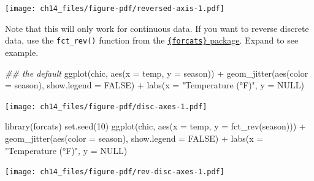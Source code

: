 \documentclass[
  letterpaper,
]{scrbook}
\newenvironment{Shaded}{\begin{snugshade}}{\end{snugshade}}
\newcommand{\AttributeTok}[1]{\textcolor[rgb]{0.40,0.45,0.13}{#1}}
\newcommand{\ConstantTok}[1]{\textcolor[rgb]{0.56,0.35,0.01}{#1}}
\newcommand{\DecValTok}[1]{\textcolor[rgb]{0.68,0.00,0.00}{#1}}
\newcommand{\DocumentationTok}[1]{\textcolor[rgb]{0.37,0.37,0.37}{\textit{#1}}}
\newcommand{\FunctionTok}[1]{\textcolor[rgb]{0.28,0.35,0.67}{#1}}
\newcommand{\NormalTok}[1]{\textcolor[rgb]{0.00,0.23,0.31}{#1}}
\newcommand{\SpecialCharTok}[1]{\textcolor[rgb]{0.37,0.37,0.37}{#1}}
\newcommand{\StringTok}[1]{\textcolor[rgb]{0.13,0.47,0.30}{#1}}
\begin{document}
\texttt{[image: ch14\_files/figure-pdf/reversed-axis-1.pdf]}

\begin{tcolorbox}[enhanced jigsaw, toprule=.15mm, bottomtitle=1mm, coltitle=black, breakable, colbacktitle=quarto-callout-note-color!10!white, opacityback=0, toptitle=1mm, colframe=quarto-callout-note-color-frame, titlerule=0mm, title=\textcolor{quarto-callout-note-color}{\faInfo}\hspace{0.5em}{Note}, bottomrule=.15mm, arc=.35mm, opacitybacktitle=0.6, leftrule=.75mm, left=2mm, rightrule=.15mm, colback=white]

Note that this will only work for continuous data. If you want to
reverse discrete data, use the \texttt{fct\_rev()} function from the
\href{https://forcats.tidyverse.org/}{\texttt{\{forcats\}} package}.
Expand to see example.

\begin{Shaded}
\begin{Highlighting}[]
\DocumentationTok{\#\# the default}
\FunctionTok{ggplot}\NormalTok{(chic, }\FunctionTok{aes}\NormalTok{(}\AttributeTok{x =}\NormalTok{ temp, }\AttributeTok{y =}\NormalTok{ season)) }\SpecialCharTok{+}
  \FunctionTok{geom\_jitter}\NormalTok{(}\FunctionTok{aes}\NormalTok{(}\AttributeTok{color =}\NormalTok{ season), }\AttributeTok{show.legend =} \ConstantTok{FALSE}\NormalTok{) }\SpecialCharTok{+}
  \FunctionTok{labs}\NormalTok{(}\AttributeTok{x =} \StringTok{"Temperature (°F)"}\NormalTok{, }\AttributeTok{y =} \ConstantTok{NULL}\NormalTok{)}
\end{Highlighting}
\end{Shaded}

\texttt{[image: ch14\_files/figure-pdf/disc-axes-1.pdf]}

\begin{Shaded}
\begin{Highlighting}[]
\FunctionTok{library}\NormalTok{(forcats)}
\FunctionTok{set.seed}\NormalTok{(}\DecValTok{10}\NormalTok{)}
\FunctionTok{ggplot}\NormalTok{(chic, }\FunctionTok{aes}\NormalTok{(}\AttributeTok{x =}\NormalTok{ temp, }\AttributeTok{y =} \FunctionTok{fct\_rev}\NormalTok{(season))) }\SpecialCharTok{+}
  \FunctionTok{geom\_jitter}\NormalTok{(}\FunctionTok{aes}\NormalTok{(}\AttributeTok{color =}\NormalTok{ season), }\AttributeTok{show.legend =} \ConstantTok{FALSE}\NormalTok{) }\SpecialCharTok{+}
  \FunctionTok{labs}\NormalTok{(}\AttributeTok{x =} \StringTok{"Temperature (°F)"}\NormalTok{, }\AttributeTok{y =} \ConstantTok{NULL}\NormalTok{)}
\end{Highlighting}
\end{Shaded}

\texttt{[image: ch14\_files/figure-pdf/rev-disc-axes-1.pdf]}

\end{tcolorbox}
\end{document}
